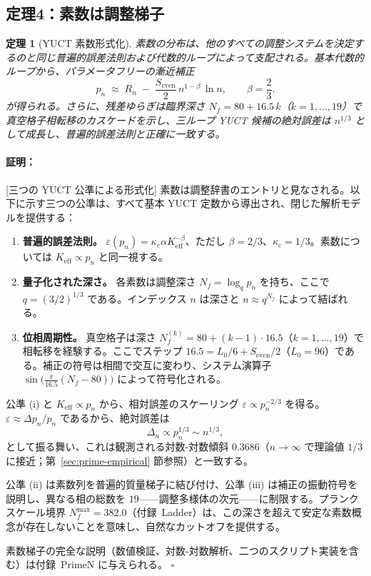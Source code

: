 \documentclass[12pt,a4paper]{article}
\newtheorem{theorem}{定理}[section]
\theoremstyle{remark}
\renewenvironment{proof}{\paragraph{証明：}}{\hfill$\square$}
\begin{document}
	\subsection{定理4：素数は調整梯子}
	
	\begin{theorem}[YUCT 素数形式化]\label{thm:prime}
		素数の分布は、他のすべての調整システムを決定するのと同じ普遍的誤差法則および代数的ループによって支配される。基本代数的ループから、パラメータフリーの漸近補正
		\begin{equation}\label{eq:yuct-prime-theorem}
			\boxed{ p_n \;\approx\; R_n \;-\; \frac{S_{\mathrm{even}}}{2}\,
				n^{1-\beta}\,\ln n },
			\qquad \beta = \frac{2}{3}.
		\end{equation}
		が得られる。さらに、残差ゆらぎは臨界深さ \(N_f = 80 + 16.5\,k\)（\(k=1,\dots,19\)）で真空格子相転移のカスケードを示し、三ループ YUCT 候補の絶対誤差は \(n^{1/3}\) として成長し、普遍的誤差法則と正確に一致する。
	\end{theorem}
	
	\begin{proof}[三つの YUCT 公準による形式化]
		素数は調整辞書のエントリと見なされる。以下に示す三つの公準は、すべて基本 YUCT 定数から導出され、閉じた解析モデルを提供する：
		\begin{enumerate}[label=(\roman*)]
			\item \textbf{普遍的誤差法則。} \(\varepsilon(p_n) = \kappa_c \alpha K_{\mathrm{eff}}^{-\beta}\)、ただし \(\beta = 2/3\)、\(\kappa_c = 1/3\)。素数については \(K_{\mathrm{eff}} \propto p_n\) と同一視する。
			\item \textbf{量子化された深さ。} 各素数は調整深さ \(N_f = \log_q p_n\) を持ち、ここで \(q = (3/2)^{1/3}\) である。インデックス \(n\) は深さと \(n \approx q^{N_f}\) によって結ばれる。
			\item \textbf{位相周期性。} 真空格子は深さ \(N_f^{(k)} = 80 + (k-1)\cdot 16.5\)（\(k=1,\dots,19\)）で相転移を経験する。ここでステップ \(16.5 = L_0/6 + S_{\mathrm{even}}/2\)（\(L_0=96\)）である。補正の符号は相間で交互に変わり、システム演算子 \(\sin\bigl(\frac{\pi}{16.5}(N_f-80)\bigr)\) によって符号化される。
		\end{enumerate}
		
		公準 (i) と \(K_{\mathrm{eff}} \propto p_n\) から、相対誤差のスケーリング \(\varepsilon \propto p_n^{-2/3}\) を得る。\(\varepsilon \approx \Delta p_n / p_n\) であるから、絶対誤差は
		\[
		\Delta_n \propto p_n^{1/3} \sim n^{1/3},
		\]
		として振る舞い、これは観測される対数-対数傾斜 \(0.3686\)（\(n\to\infty\) で理論値 \(1/3\) に接近；第~\ref{sec:prime-empirical} 節参照）と一致する。
		
		公準 (ii) は素数列を普遍的質量梯子に結び付け、公準 (iii) は補正の振動符号を説明し、異なる相の総数を \(19\)——調整多様体の次元——に制限する。プランクスケール境界 \(N_f^{\max} = 382.0\)（付録~Ladder）は、この深さを超えて安定な素数概念が存在しないことを意味し、自然なカットオフを提供する。
		
		素数梯子の完全な説明（数値検証、対数-対数解析、二つのスクリプト実装を含む）は付録~PrimeN に与えられる。
	\end{proof}
	
\end{document}
